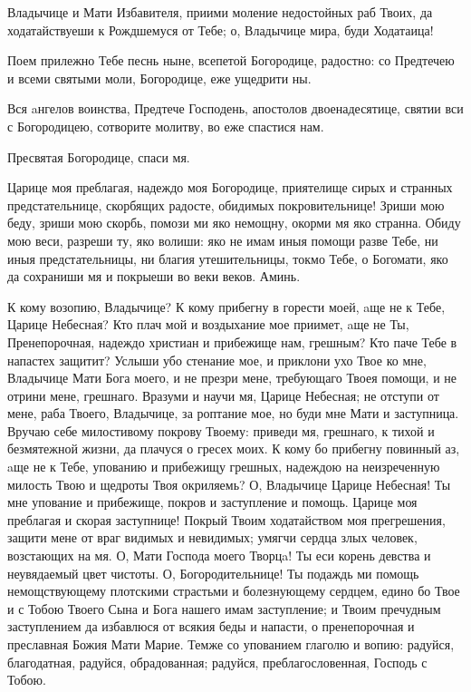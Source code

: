 \begin{mymulticols}
Владычице и Мати Избавителя, приими моление недостойных раб Твоих, да ходатайствуеши к Рождшемуся от Тебе; о, Владычице мира, буди Ходатаица!

Поем прилежно Тебе песнь ныне, всепетой Богородице, радостно: со Предтечею и всеми святыми моли, Богородице, еже ущедрити ны.

Вся aнгелов воинства, Предтече Господень, апостолов двоенадесятице, святии вси с Богородицею, сотворите молитву, во еже спастися нам.


Пресвятая Богородице, спаси мя.

Царице моя преблагая, надеждо моя Богородице, приятелище сирых и странных предстательнице, скорбящих радосте, обидимых покровительнице! Зриши мою беду, зриши мою скорбь, помози ми яко немощну, окорми мя яко странна. Обиду мою веси, разреши ту, яко волиши: яко не имам иныя помощи разве Тебе, ни иныя предстательницы, ни благия утешительницы, токмо Тебе, о Богомати, яко да сохраниши мя и покрыеши во веки веков. Аминь.

К кому возопию, Владычице? К кому прибегну в горести моей, aще не к Тебе, Царице Небесная? Кто плач мой и воздыхание мое приимет, aще не Ты, Пренепорочная, надеждо христиан и прибежище нам, грешным? Кто паче Тебе в напастех защитит? Услыши убо стенание мое, и приклони ухо Твое ко мне, Владычице Мати Бога моего, и не презри мене, требующаго Твоея помощи, и не отрини мене, грешнаго. Вразуми и научи мя, Царице Небесная; не отступи от мене, раба Твоего, Владычице, за роптание мое, но буди мне Мати и заступница. Вручаю себе милостивому покрову Твоему: приведи мя, грешнаго, к тихой и безмятежной жизни, да плачуся о гресех моих. К кому бо прибегну повинный аз, aще не к Тебе, упованию и прибежищу грешных, надеждою на неизреченную милость Твою и щедроты Твоя окриляемь? О, Владычице Царице Небесная! Ты мне упование и прибежище, покров и заступление и помощь. Царице моя преблагая и скорая заступнице! Покрый Твоим ходатайством моя прегрешения, защити мене от враг видимых и невидимых; умягчи сердца злых человек, возстающих на мя. О, Мати Господа моего Творцa! Ты еси корень девства и неувядаемый цвет чистоты. О, Богородительнице! Ты подаждь ми помощь немощствующему плотскими страстьми и болезнующему сердцем, едино бо Твое и с Тобою Твоего Сына и Бога нашего имам заступление; и Твоим пречудным заступлением да избавлюся от всякия беды и напасти, о пренепорочная и преславная Божия Мати Марие. Темже со упованием глаголю и вопию: радуйся, благодатная, радуйся, обрадованная; радуйся, преблагословенная, Господь с Тобою.

\end{mymulticols}

